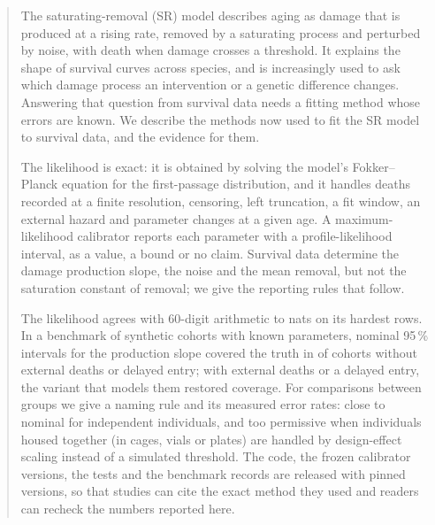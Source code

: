 \begin{abstract}
\noindent The saturating-removal (SR) model describes aging as damage that is produced at a rising rate, removed by a
saturating process and perturbed by noise, with death when damage crosses a threshold. It explains the shape of
survival curves across species, and is increasingly used to ask which damage process an intervention or a genetic
difference changes. Answering that question from survival data needs a fitting method whose errors are known. We
describe the methods now used to fit the SR model to survival data, and the evidence for them.

The likelihood is exact: it is obtained by solving the model's Fokker--Planck equation for the first-passage
distribution, and it handles deaths recorded at a finite resolution, censoring, left truncation, a fit window, an
external hazard and parameter changes at a given age. A maximum-likelihood calibrator reports each parameter with a
profile-likelihood interval, as a value, a bound or no claim. Survival data determine the damage production slope,
the noise and the mean removal, but not the saturation constant of removal; we give the reporting rules that follow.

The likelihood agrees with 60-digit arithmetic to  nats on its hardest rows. In a
benchmark of  synthetic cohorts with known parameters, nominal 95\,\% intervals for the production slope
covered the truth in  of  cohorts without external deaths or delayed entry;
with external deaths or a delayed entry, the variant that models them restored coverage. For comparisons between groups we give a naming rule and its measured
error rates: close to nominal for independent individuals, and too permissive when individuals housed together (in cages, vials or plates) are handled by
design-effect scaling instead of a simulated threshold. The code, the frozen calibrator versions, the tests and the
benchmark records are released with pinned versions, so that studies can cite the exact method they used and readers
can recheck the numbers reported here.
\end{abstract}
